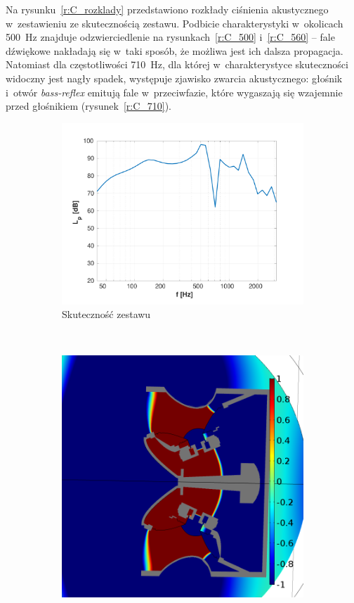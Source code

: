\documentclass[12pt]{oska}
\begin{document}
		Na rysunku~\ref{r:C_rozklady} przedstawiono rozkłady ciśnienia akustycznego w~zestawieniu ze skutecznością zestawu. Podbicie charakterystyki w~okolicach \SI{500}{\hertz} znajduje odzwierciedlenie na rysunkach~\ref{r:C_500} i~\ref{r:C_560} -- fale dźwiękowe nakładają się w~taki sposób, że możliwa jest ich dalsza propagacja. Natomiast dla częstotliwości \SI{710}{\hertz}, dla której w~charakterystyce skuteczności widoczny jest nagły spadek, występuje zjawisko zwarcia akustycznego: głośnik i~otwór \textit{bass-reflex} emitują fale w~przeciwfazie, które wygaszają się wzajemnie przed głośnikiem (rysunek~\ref{r:C_710}).
		
		\begin{figure}[!ht]
		\centering
			\begin{subfigure}[b]{.49\textwidth}
			\includegraphics[width=\textwidth,trim={1.25cm .5cm 2cm 1cm},clip]{skutecznosc_comsol.pdf}
				\caption{Skuteczność zestawu}
				\label{r:C_skutecznosc}
			\end{subfigure}
			~
			\begin{subfigure}[b]{.49\textwidth}
				\includegraphics[width=\textwidth]{pres_sig_500Hz.png}

\end{subfigure}
\end{figure}
\end{document}
